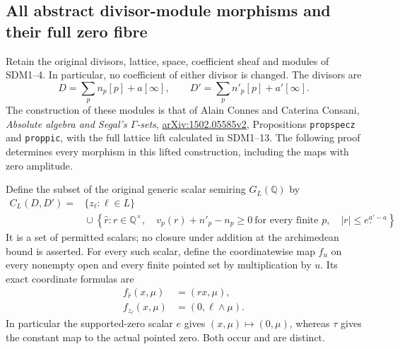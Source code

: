 \subsection{All abstract divisor-module morphisms and their full zero fibre}
\label{sec:sdm-all-morphisms}

Retain the original divisors, lattice, space, coefficient sheaf and
modules of SDM1--4. In particular, no coefficient of either divisor
is changed. The divisors are
\[
D=\sum_p n_p[p]+a[\infty],
\qquad
D'=\sum_p n'_p[p]+a'[\infty].
\]
The construction of these modules is that of Alain Connes and
Caterina Consani, \emph{Absolute algebra and Segal's $\Gamma$-sets},
\href{https://arxiv.org/abs/1502.05585v2}{arXiv:1502.05585v2},
Propositions \texttt{propspecz} and \texttt{proppic}, with the full
lattice lift calculated in SDM1--13. The following proof determines
every morphism in this lifted construction, including the maps with
zero amplitude.

Define the subset of the original generic scalar semiring
$G_L(\mathbb Q)$ by
\begin{equation}\tag{SDM14}
\begin{split}
C_L(D,D')={}&\{z_\ell:\ell\in L\}\\
 &{}\cup
\left\{\widehat r:r\in\mathbb Q^\times,\quad
       v_p(r)+n'_p-n_p\ge0\ \text{for every finite }p,\quad
       |r|\le e^{a'-a}\right\}.
\end{split}
\end{equation}
It is a set of permitted scalars; no closure under addition at the
archimedean bound is asserted. For every such scalar, define the
coordinatewise map $f_u$ on every nonempty open and every finite
pointed set by multiplication by $u$. Its exact coordinate formulas
are
\begin{equation}\tag{SDM15}
\begin{aligned}
 f_{\widehat r}(x,\mu)&=(rx,\mu),\\
 f_{z_\ell}(x,\mu)&=(0,\ell\wedge\mu).
\end{aligned}
\end{equation}
In particular the supported-zero scalar $e$ gives
$(x,\mu)\mapsto(0,\mu)$, whereas $\tau$ gives the constant map
to the actual pointed zero. Both occur and are distinct.

